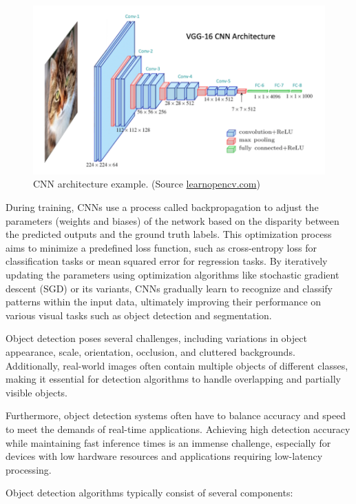 \begin{figure}
  \centering
  \includegraphics[width=\linewidth]{text/chapter_03/imgs/CNN}
  \caption{CNN architecture example. (Source \href{https://learnopencv.com/understanding-convolutional-neural-networks-cnn/}{learnopencv.com})}
  \label{fig:CNNArchitecture}
\end{figure}

During training, CNNs use a process called backpropagation to adjust the parameters (weights and biases) of the network based on the disparity between the predicted outputs and the ground truth labels. This optimization process aims to minimize a predefined loss function, such as cross-entropy loss for classification tasks or mean squared error for regression tasks. By iteratively updating the parameters using optimization algorithms like stochastic gradient descent (SGD) or its variants, CNNs gradually learn to recognize and classify patterns within the input data, ultimately improving their performance on various visual tasks such as object detection and segmentation.


Object detection poses several challenges, including variations in object appearance, scale, orientation, occlusion, and cluttered backgrounds. Additionally, real-world images often contain multiple objects of different classes, making it essential for detection algorithms to handle overlapping and partially visible objects.

Furthermore, object detection systems often have to balance accuracy and speed to meet the demands of real-time
applications. Achieving high detection accuracy while maintaining fast inference times is an immense challenge,
especially for devices with low hardware resources and applications requiring low-latency processing.

Object detection algorithms typically consist of several components:

